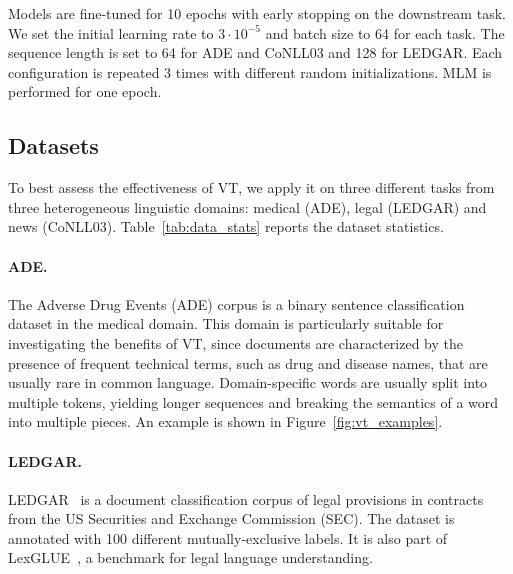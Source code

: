 \documentclass[11pt]{article}
\begin{document}
Models are fine-tuned for 10 epochs with early stopping on the downstream task. We set the initial learning rate to $3\cdot10^{-5}$ and batch size to 64 for each task. The sequence length is set to 64 for ADE and CoNLL03 and 128 for LEDGAR. Each configuration is repeated 3 times with different random initializations. MLM is performed for one epoch.

\subsection{Datasets}
To best assess the effectiveness of VT, we apply it on three different tasks from three heterogeneous linguistic domains: medical (ADE), legal (LEDGAR) and news (CoNLL03). %
Table~\ref{tab:data_stats} reports the dataset statistics.

  
  \paragraph{ADE.} The Adverse Drug Events (ADE) corpus \citep{GURULINGAPPA2012885} is a binary sentence classification dataset in the medical domain. This domain is particularly suitable for investigating the benefits of VT, since documents are characterized by the presence of frequent technical terms, such as drug and disease names, that are usually rare in common language. Domain-specific words are usually split into multiple tokens, yielding longer sequences and breaking the semantics of a word into multiple pieces. An example is shown in Figure~\ref{fig:vt_examples}. 

  \paragraph{LEDGAR.} LEDGAR~\cite{tuggener2020ledgar} is a document classification corpus of legal provisions in contracts from the US Securities and Exchange Commission (SEC). The dataset is annotated  with 100 different mutually-exclusive labels. It is also part of LexGLUE~\cite{chalkidis-etal-2022-lexglue}, a benchmark for legal language understanding.
\end{document}

